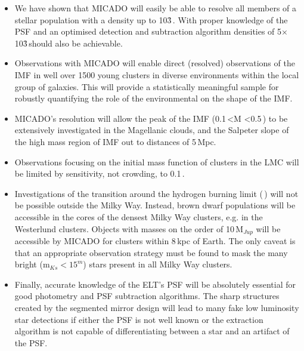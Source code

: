 \begin{itemize}
    \item We have shown that MICADO will easily be able to resolve all members of a stellar population with a density up to 10\h3\,\spa. With proper knowledge of the PSF and an optimised detection and subtraction algorithm densities of 5$\times$10\h3\,\spa should also be achievable.
    
    \item Observations with MICADO will enable direct (resolved) observations of the IMF in well over 1500 young clusters in diverse environments within the local group of galaxies. This will provide a statistically meaningful sample for robustly quantifying the role of the environmental on the shape of the IMF.

    
    \item MICADO's resolution will allow the peak of the IMF (0.1\,\msun\textless M \textless0.5\,\msune) to be extensively investigated in the Magellanic clouds, and the Salpeter slope of the high mass region of IMF out to distances of 5\,Mpc.
    
    \item Observations focusing on the initial mass function of clusters in the LMC will be limited by sensitivity, not crowding, to 0.1\,\msun. 
    
    \item Investigations of the transition around the hydrogen burning limit (\,\msun) will not be possible outside the Milky Way. Instead, brown dwarf populations will be accessible in the cores of the densest Milky Way clusters, e.g. in the Westerlund clusters. Objects with masses on the order of 10\,M$_{Jup}$ will be accessible by MICADO for clusters within 8\,kpc of Earth. The only caveat is that an appropriate observation strategy must be found to mask the many bright (m$_{Ks}<15^m$) stars present in all Milky Way clusters.    
    
    \item Finally, accurate knowledge of the ELT's PSF will be absolutely essential for good photometry and PSF subtraction algorithms. The sharp structures created by the segmented mirror design will lead to many fake low luminosity star detections if either the PSF is not well known or the extraction algorithm is not capable of differentiating between a star and an artifact of the PSF.
    
\end{itemize}


